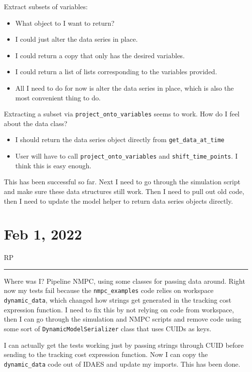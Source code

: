 \documentclass{article}
\newcommand{\RP}{\vspace{0.5cm}RP\vspace{0.2cm}\hrule\vspace{0.2cm}}
\begin{document}
Extract subsets of variables:
\begin{itemize}
  \item What object to I want to return?
  \item I could just alter the data series in place.
  \item I could return a copy that only has the desired variables.
  \item I could return a list of lists corresponding to the variables
    provided.
  \item All I need to do for now is alter the data series in place, which
    is also the most convenient thing to do.
\end{itemize}

Extracting a subset via \texttt{project\_onto\_variables} seems to work.
How do I feel about the data class?
\begin{itemize}
  \item I should return the data series object directly from
    \texttt{get\_data\_at\_time}
  \item User will have to call \texttt{project\_onto\_variables}
    and \texttt{shift\_time\_points}. I think this is easy enough.
\end{itemize}

This has been successful so far. Next I need to go through the simulation
script and make sure these data structures still work.
Then I need to pull out old code, then I need to update the model helper
to return data series objects directly.

\section{Feb 1, 2022}

\RP
Where was I?
Pipeline NMPC, using some classes for passing data around.
Right now my tests fail because the \texttt{nmpc\_examples} code relies on
workspace \texttt{dynamic\_data}, which changed how strings get generated in
the tracking cost expression function.
I need to fix this by not relying on code from workspace, then I can go through
the simulation and NMPC scripts and remove code using some sort of
\texttt{DynamicModelSerializer} class that uses CUIDs as keys.

I can actually get the tests working just by passing strings through CUID before
sending to the tracking cost expression function.
Now I can copy the \texttt{dynamic\_data} code out of IDAES and update my imports.
This has been done.
\end{document}
